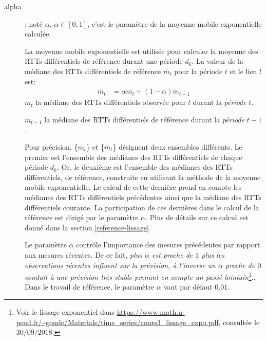 \begin{description}
	\item[alpha ]: noté $\alpha$,  $\alpha \in [0, 1]$, c'est le paramètre de la  moyenne mobile exponentielle calculée.
	
	La  moyenne mobile exponentielle est utilisée pour calculer la moyenne des RTTs différentiels de référence durant une période $d_k$.
	La  valeur de la médiane des RTTs différentiels de référence $ \overline{m}_{t}$   pour la période $ t $ et  le lien $l$ est:
	\begin{align}
	\overline{m}_{t} &=  \alpha{m}_{t} + (1 -  \alpha)  \overline{m}_{t-1} \label{moyenne-exponenetiel}
	\end{align} 
	$m_t$ la médiane des RTTs différentiels observée pour $l$ durant la \textit{période} $t$. 
	
	$ \overline{m}_{t-1}$  la médiane des  RTTs différentiels  de référence durant la \textit{période} $ t-1 $.  
	
	Pour précision, \{$m_t$\} et \{$ \overline{m}_{t}$\} désignent deux ensembles différents.   Le premier est l'ensemble des médianes des RTTs différentiels de chaque période $d_k$. Or, le deuxième est l'ensemble des médianes des RTTs différentiels, de référence, construite en utilisant la méthode de la moyenne mobile exponentielle. Le calcul de cette dernière prend en compte les médianes des RTTs différentiels précédentes ainsi que la médiane des RTTs différentiels courante. La participation de ces dernières dans le calcul de la référence est dirigé par le paramètre $\alpha$. Plus de détails sur ce calcul est donné dans la section  \ref{reference-lissage}.
	
	Le paramètre $\alpha$  contrôle l'importance  des mesures précédentes par rapport aux mesures récentes. De ce fait, \guillemotleft \textit{plus $\alpha$ est proche de $ 1 $ plus les observations récentes influent sur la prévision, à l'inverse un $\alpha$ proche de $0$ conduit à une prévision très stable prenant en compte un passé lointain}\footnote{Voir le lissage exponentiel dans \url{https://www.math.u-psud.fr/~goude/Materials/time_series/cours3_lissage_expo.pdf}, consultée le $30/09/2018$.}.\guillemotright.  Dans le travail de référence, le paramètre $\alpha$  vaut par défaut $0.01$.
	

\end{description}
